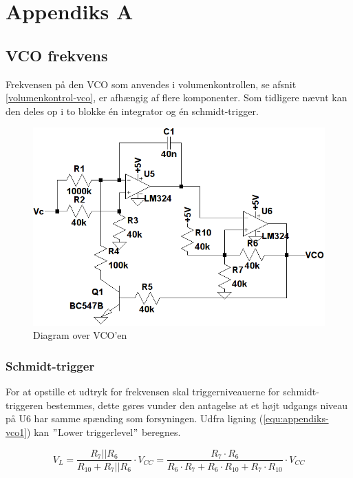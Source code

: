 \chapter{Appendiks A}
\label{vco-frekvens}
\section*{VCO frekvens}

Frekvensen på den VCO som anvendes i volumenkontrollen, se afsnit \ref{volumenkontrol-vco}, er afhængig af flere komponenter. Som tidligere nævnt kan den deles op i to blokke én integrator og én schmidt-trigger. 

\begin{figure}[h]
\centering
\includegraphics[width=\textwidth]{teknisk/volumenkontrol/vco.png}
\caption{Diagram over VCO'en}
\label{fig:appendiks-vco}
\end{figure}

\subsection*{Schmidt-trigger}

For at opstille et udtryk for frekvensen skal triggerniveauerne for schmidt-triggeren bestemmes, dette gøres vunder den antagelse at et højt udgangs niveau på U6 har samme spænding som forsyningen. Udfra ligning (\ref{equ:appendiks-vco1}) kan $"$Lower triggerlevel$"$ beregnes.

\begin{equation}
\label{equ:appendiks-vco1}
V_L = \frac{R_7||R_6}{R_{10} + R_7||R_6} \cdot V_{CC} = \frac{R_7 \cdot R_6}{R_6 \cdot R_7 + R_6 \cdot R_{10} + R_7 \cdot R_{10}} \cdot V_{CC}
\end{equation}


